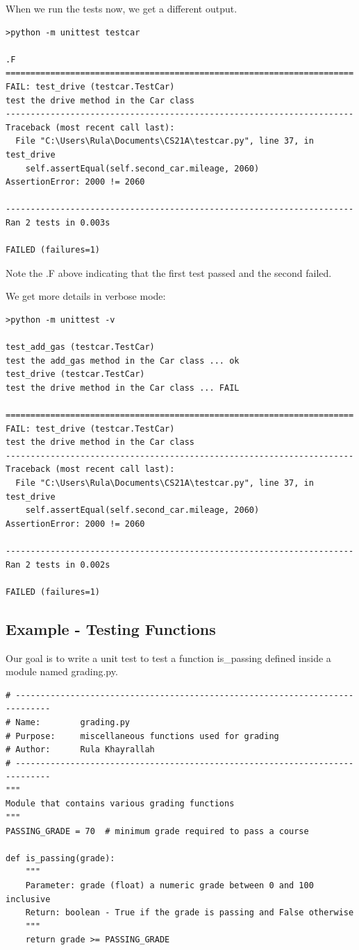 \documentclass{article}
\begin{document}
When we run the tests now, we get a different output.
 
 \begin{lstlisting}
>python -m unittest testcar
 
.F
======================================================================
FAIL: test_drive (testcar.TestCar)
test the drive method in the Car class
----------------------------------------------------------------------
Traceback (most recent call last):
  File "C:\Users\Rula\Documents\CS21A\testcar.py", line 37, in test_drive
    self.assertEqual(self.second_car.mileage, 2060)
AssertionError: 2000 != 2060
 
----------------------------------------------------------------------
Ran 2 tests in 0.003s
 
FAILED (failures=1)
\end{lstlisting}

Note the .F above indicating that the first test passed and the second failed. 

We get more details in verbose mode:

\begin{lstlisting}
>python -m unittest -v
 
test_add_gas (testcar.TestCar)
test the add_gas method in the Car class ... ok
test_drive (testcar.TestCar)
test the drive method in the Car class ... FAIL
 
======================================================================
FAIL: test_drive (testcar.TestCar)
test the drive method in the Car class
----------------------------------------------------------------------
Traceback (most recent call last):
  File "C:\Users\Rula\Documents\CS21A\testcar.py", line 37, in test_drive
    self.assertEqual(self.second_car.mileage, 2060)
AssertionError: 2000 != 2060
 
----------------------------------------------------------------------
Ran 2 tests in 0.002s
 
FAILED (failures=1)
\end{lstlisting}

\subsection{Example - Testing Functions}
Our goal is to write a unit test to test a function is{\_}passing defined inside a module named grading.py.

\begin{lstlisting}
# -----------------------------------------------------------------------------
# Name:        grading.py
# Purpose:     miscellaneous functions used for grading
# Author:      Rula Khayrallah
# -----------------------------------------------------------------------------
"""
Module that contains various grading functions
"""
PASSING_GRADE = 70  # minimum grade required to pass a course
 
def is_passing(grade):
    """
    Parameter: grade (float) a numeric grade between 0 and 100 inclusive
    Return: boolean - True if the grade is passing and False otherwise
    """
    return grade >= PASSING_GRADE
\end{lstlisting}
 
\end{document}

